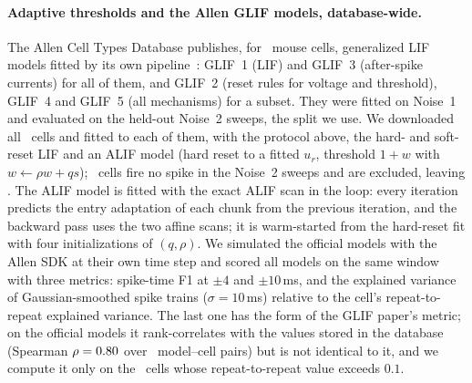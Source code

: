 \documentclass[10pt]{article}
\theoremstyle{remark}
\begin{document}
\paragraph{Adaptive thresholds and the Allen GLIF models, database-wide.}
The Allen Cell Types Database publishes, for \GlifCellsAll\ mouse cells, generalized LIF models fitted by its own pipeline~\citep{teeter2018glif}: GLIF~1 (LIF) and GLIF~3 (after-spike currents) for all of them, and GLIF~2 (reset rules for voltage and threshold), GLIF~4 and GLIF~5 (all mechanisms) for a subset. They were fitted on Noise~1 and evaluated on the held-out Noise~2 sweeps, the split we use. We downloaded all \GlifCellsAll\ cells and fitted to each of them, with the protocol above, the hard- and soft-reset LIF and an ALIF model (hard reset to a fitted $u_r$, threshold $1+w$ with $w\leftarrow\rho w+qs$); \GlifNoSpike\ cells fire no spike in the Noise~2 sweeps and are excluded, leaving \GlifCellsSpk. The ALIF model is fitted with the exact ALIF scan in the loop: every iteration predicts the entry adaptation of each chunk from the previous iteration, and the backward pass uses the two affine scans; it is warm-started from the hard-reset fit with four initializations of $(q,\rho)$. We simulated the official models with the Allen SDK at their own time step and scored all models on the same window with three metrics: spike-time F1 at $\pm4$ and $\pm10$\,ms, and the explained variance of Gaussian-smoothed spike trains ($\sigma=10$\,ms) relative to the cell's repeat-to-repeat explained variance. The last one has the form of the GLIF paper's metric; on the official models it rank-correlates with the values stored in the database (Spearman $\rho=0.80$ over \EvOfficialPairs\ model--cell pairs) but is not identical to it, and we compute it only on the \GlifEvCells\ cells whose repeat-to-repeat value exceeds $0.1$.
\end{document}
